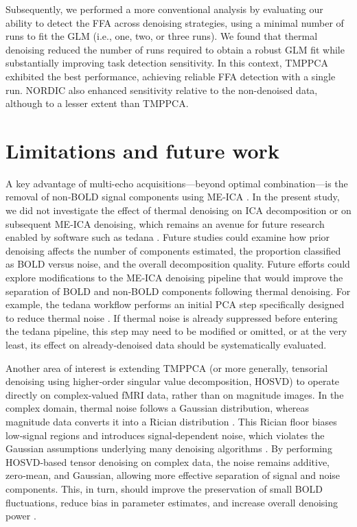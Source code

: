 Subsequently, we performed a more conventional analysis by evaluating our ability to detect the FFA \citep{kanwisherFusiformFaceArea1997} across denoising strategies, using a minimal number of runs to fit the GLM (i.e., one, two, or three runs). We found that thermal denoising reduced the number of runs required to obtain a robust GLM fit while substantially improving task detection sensitivity. In this context, TMPPCA exhibited the best performance, achieving reliable FFA detection with a single run. NORDIC also enhanced sensitivity relative to the non-denoised data, although to a lesser extent than TMPPCA.\\


\section{Limitations and future work}

A key advantage of multi-echo acquisitions—beyond optimal combination—is the removal of non‑BOLD signal components using ME‑ICA \citep{kundu2012differentiating,kundu2017multi}. In the present study, we did not investigate the effect of thermal denoising on ICA decomposition or on subsequent ME‑ICA denoising, which remains an avenue for future research enabled by software such as tedana \citep{dupre2021te}. Future studies could examine how prior denoising affects the number of components estimated, the proportion classified as BOLD versus noise, and the overall decomposition quality. Future efforts could explore modifications to the ME‑ICA denoising pipeline that would improve the separation of BOLD and non‑BOLD components following thermal denoising. For example, the tedana workflow performs an initial PCA step specifically designed to reduce thermal noise \citep{dupre2021te}. If thermal noise is already suppressed before entering the tedana pipeline, this step may need to be modified or omitted, or at the very least, its effect on already‑denoised data should be systematically evaluated. 

Another area of interest is extending TMPPCA (or more generally, tensorial denoising using higher‑order singular value decomposition, HOSVD) to operate directly on complex‑valued fMRI data, rather than on magnitude images. In the complex domain, thermal noise follows a Gaussian distribution, whereas magnitude data converts it into a Rician distribution \citep{gudbjartssonRicianDistributionNoisy1995c}. This Rician floor biases low‑signal regions and introduces signal‑dependent noise, which violates the Gaussian assumptions underlying many denoising algorithms \citep{veraart2016denoising, comby2023denoising}. By performing HOSVD‑based tensor denoising on complex data, the noise remains additive, zero‑mean, and Gaussian, allowing more effective separation of signal and noise components. This, in turn, should improve the preservation of small BOLD fluctuations, reduce bias in parameter estimates, and increase overall denoising power \citep{wangModifiedHigherorderSingular2020}.



